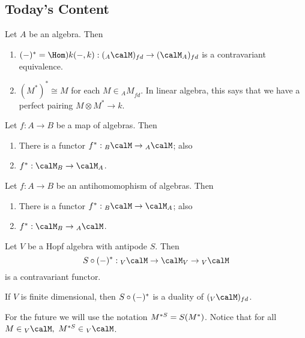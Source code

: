 \documentclass[12pt]{article}
\let\tilde\relax
\newcommand*{\tilde}[1]{\widetilde{#1}}
\begin{document}
\subsection{Today's Content}
\begin{lem}\label{lem-ref]}
	Let $A$ be an algebra. Then
	\begin{enumerate}
		\item $(-)^*=\Hom)k(-,k):({_A\calM})_{fd}\to(\calM_A)_{fd}$ is a contravariant equivalence.
		\item $(M^*)^*\cong M$ for each $M\in{_AM}_{fd}$. In linear algebra, this says that we have a perfect pairing $M\otimes M^*\to k$.
	\end{enumerate}
\end{lem}
\begin{lem}\label{lem-res1]}
	Let $f:A\to B$ be a map of algebras. Then
	\begin{enumerate}
		\item There is a functor $f^*:{_B\calM}\to{_A\calM}$; also 
		\item $f^*:\calM_B\to\calM_A$.
	\end{enumerate}
\end{lem}
\begin{lem}\label{lem-res2}
	Let $f:A\to B$ be an antihomomophism of algebras. Then
	\begin{enumerate}
		\item There is a functor $f^*:{_B\calM}\to{\calM_A}$; also 
		\item $f^*:\calM_B\to{_A\calM}$.
	\end{enumerate}
\end{lem}
\begin{lem}
	Let $V$ be a Hopf algebra with antipode $S$. Then 
	\[\tilde S\circ (-)^*:{_V\calM}\to \calM_V\to {_V\calM}\]
	is a contravariant functor.
\end{lem}
\begin{cor}
	If $V$ is finite dimensional, then $\tilde S\circ(-)^*$ is a duality of $(_V\calM)_{fd}$.
\end{cor}
For the future we will use the notation $M^{*S}=\tilde S(M^*)$. Notice that for all $M\in{_V\calM},$ $M^{*S}\in{_V\calM}$.
\end{document}
